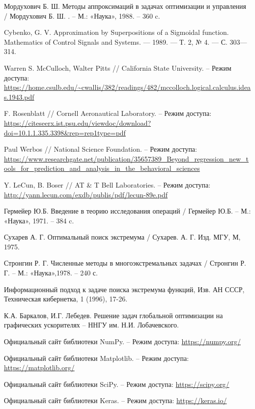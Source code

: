 \documentclass[11pt, oneside, a4paper]{article}
\begin{document}
\begin{biblio}
Мордухович Б. Ш. Методы аппроксимаций в задачах оптимизации и управления / Мордухович Б. Ш. . – М.: «Наука», 1988. – 360 c.

Cybenko, G. V. Approximation by Superpositions of a Sigmoidal function. Mathematics of Control Signals and Systems. — 1989. — Т. 2, № 4. — С. 303—314.

Warren S. McCulloch, Walter Pitts // California State University. – Режим доступа: \url{https://home.csulb.edu/~cwallis/382/readings/482/mccolloch.logical.calculus.ideas.1943.pdf}

F. Rosenblatt // Cornell Aeronautical Laboratory. – Режим доступа: \url{https://citeseerx.ist.psu.edu/viewdoc/download?doi=10.1.1.335.3398&rep=rep1type=pdf}

Paul Werbos // National Science Foundation. – Режим доступа: \url{https://www.researchgate.net/publication/35657389_Beyond_regression_new_tools_for_prediction_and_analysis_in_the_behavioral_sciences}

Y. LeCun, B. Boser // AT \& T  Bell Laboratories. – Режим доступа: \url{http://yann.lecun.com/exdb/publis/pdf/lecun-89e.pdf}

Гермейер Ю.Б. Введение в теорию исследования операций / Гермейер Ю.Б. – М.: «Наука», 1971. – 384 c.

Сухарев А. Г. Оптимальный поиск экстремума / Сухарев. А. Г. Изд. МГУ, М, 1975. 

Стронгин Р. Г. Численные методы в многоэкстремальных задачах / Стронгин Р. Г. – М.: «Наука»,1978. – 240 с.

Информационный подход к задаче поиска экстремума функций, Изв. АН СССР, Техническая кибернетка, 1 (1996), 17-26.

К.А. Баркалов, И.Г. Лебедев. Решение задач глобальной оптимизации 
на графических ускорителях – ННГУ им. Н.И. Лобачевского.

Официальный сайт библиотеки NumPy. – Режим доступа: \url{https://numpy.org/}

Официальный сайт библиотеки Matplotlib. – Режим доступа: \url{https://matplotlib.org/}

Официальный сайт библиотеки SciPy. – Режим доступа: \url{https://scipy.org/}

Официальный сайт библиотеки Keras. – Режим доступа: \url{https://keras.io/}


\end{biblio}
\end{document}
